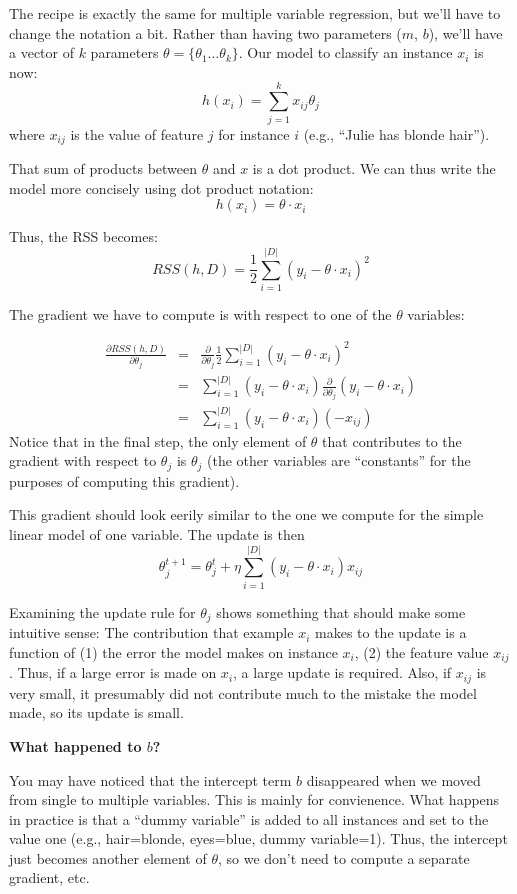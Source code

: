 \documentclass{article}
\begin{document}
The recipe is exactly the same for multiple variable regression,
but we'll have to change the notation a bit. Rather than having two
parameters ($m$, $b$), we'll have a vector of $k$ parameters
$\theta=\{\theta_1 \ldots \theta_k\}$. Our model to classify an
  instance $x_i$ is now:
$$
h(x_i) = \sum_{j=1}^{k} x_{ij}\theta_j
$$ where $x_{ij}$ is the value of feature $j$ for instance $i$ (e.g.,
``Julie has blonde hair'').

That sum of products between $\theta$ and $x$ is a dot product. We can
thus write the model more concisely using dot product notation:
$$
h(x_i) = \theta \cdot  x_i
$$

Thus, the RSS becomes:
$$
RSS(h, D) = \frac{1}{2}\sum_{i=1}^{|D|}(y_i - \theta \cdot x_i)^2
$$

The gradient we have to compute is with respect to one of the $\theta$ variables:

\begin{eqnarray*}
\frac{\partial RSS(h, D)}{\partial \theta_j} &=& \frac{\partial}{\partial \theta_j} \frac{1}{2}\sum_{i=1}^{|D|}(y_i - \theta \cdot x_i)^2\\
&=& \sum_{i=1}^{|D|}(y_i - \theta \cdot x_i)\frac{\partial}{\partial \theta_j} (y_i - \theta \cdot x_i)\\
&=& \sum_{i=1}^{|D|}(y_i - \theta \cdot x_i)(-x_{ij})
\end{eqnarray*}
Notice that in the final step, the only element of $\theta$ that
contributes to the gradient with respect to $\theta_j$ is $\theta_j$
(the other variables are ``constants'' for the purposes of computing
this gradient).

This gradient should look eerily similar to the one we compute for the
simple linear model of one variable. The update is then
$$
\theta_j^{t+1} = \theta_j^{t} + \eta \sum_{i=1}^{|D|}(y_i - \theta \cdot x_i)x_{ij}
$$

Examining the update rule for $\theta_j$ shows something that should
make some intuitive sense: The contribution that example $x_i$ makes
to the update is a function of (1) the error the model makes on
instance $x_i$, (2) the feature value $x_{ij}$. Thus, if a large error is made on $x_i$, a large update is required. Also, if $x_{ij}$ is
very small, it presumably did not contribute much to the mistake the
model made, so its update is small.

{\bf What happened to $b$?}

You may have noticed that the intercept term $b$ disappeared when we
moved from single to multiple variables. This is mainly for
convienence. What happens in practice is that a ``dummy variable'' is
added to all instances and set to the value one (e.g., hair=blonde,
eyes=blue, dummy variable=1). Thus, the intercept just becomes another
element of $\theta$, so we don't need to compute a separate gradient,
etc.
\end{document}
